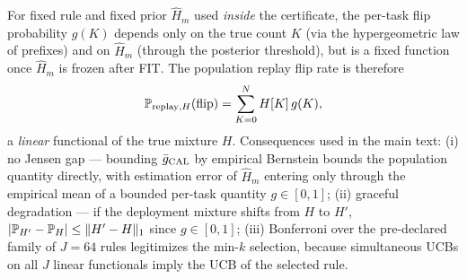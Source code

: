 For fixed rule and fixed prior $\widehat H_m$ used \emph{inside} the
certificate, the per-task flip probability $g(K)$ depends only on the true
count $K$ (via the hypergeometric law of prefixes) and on $\widehat H_m$
(through the posterior threshold), but is a fixed function once $\widehat H_m$
is frozen after FIT. The population replay flip rate is therefore
\[
\P_{\text{replay},H}(\flip)=\sum_{K=0}^{N} H[K]\,g(K),
\]
a \emph{linear} functional of the true mixture $H$. Consequences used in the
main text: (i) no Jensen gap --- bounding $\bar g_{\calD}$ by empirical
Bernstein bounds the population quantity directly, with estimation error of
$\widehat H_m$ entering only through the empirical mean of a bounded per-task
quantity $g\in[0,1]$; (ii) graceful degradation --- if the deployment mixture
shifts from $H$ to $H'$, $|\P_{H'}-\P_H|\le\|H'-H\|_1$ since
$g\in[0,1]$; (iii) Bonferroni over the pre-declared family of $J=64$ rules
legitimizes the min-$k$ selection, because simultaneous UCBs on all $J$
linear functionals imply the UCB of the selected rule.
